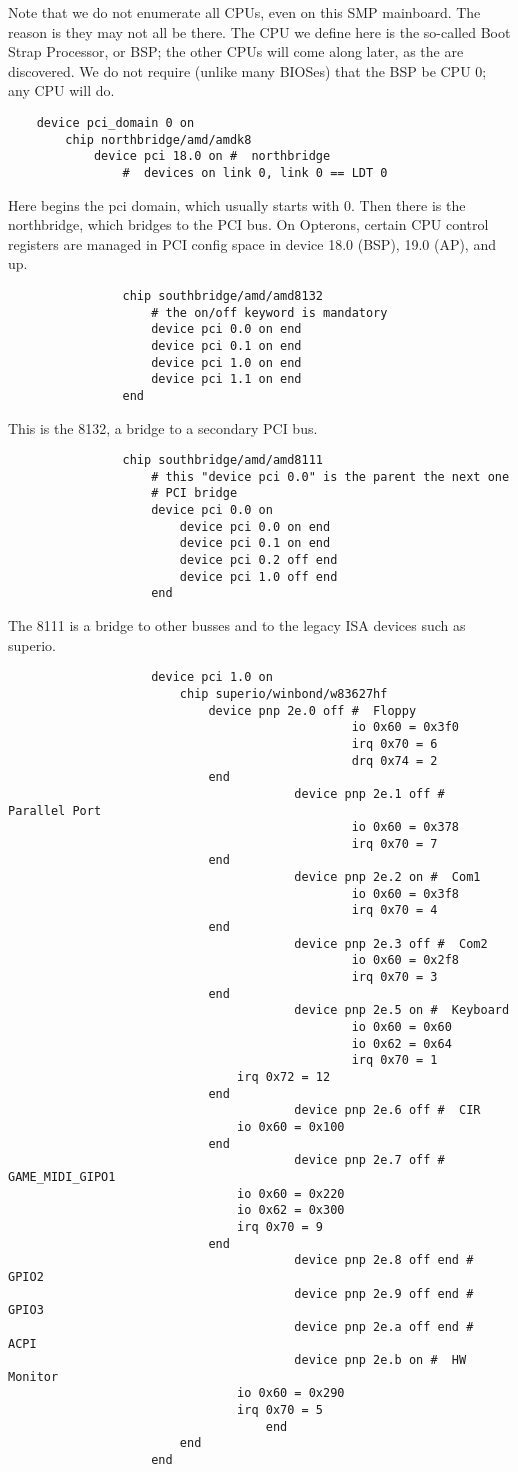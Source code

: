 \documentclass[10pt,letterpaper]{article}
\begin{document}
Note that we do not enumerate all CPUs, even on this SMP mainboard. The reason is they may not all be there. The CPU we define here 
is the so-called Boot Strap Processor, or BSP; the other CPUs will come along later, as the are discovered. We do not require (unlike many 
BIOSes) that the BSP be CPU 0; any CPU will do. 
\begin{verbatim}
	device pci_domain 0 on
		chip northbridge/amd/amdk8
			device pci 18.0 on #  northbridge 
				#  devices on link 0, link 0 == LDT 0
\end{verbatim}
Here begins the pci domain, which usually starts with 0. Then there is the northbridge, which bridges to the PCI bus. On 
Opterons, certain CPU control registers are managed in PCI config space in device 18.0 (BSP), 19.0 (AP), and up. 
\begin{verbatim}
				chip southbridge/amd/amd8132
					# the on/off keyword is mandatory
					device pci 0.0 on end
					device pci 0.1 on end
					device pci 1.0 on end
					device pci 1.1 on end
				end
\end{verbatim}
This is the 8132, a bridge to a secondary PCI bus. 
\begin{verbatim}
				chip southbridge/amd/amd8111
					# this "device pci 0.0" is the parent the next one
					# PCI bridge
					device pci 0.0 on
						device pci 0.0 on end
						device pci 0.1 on end
						device pci 0.2 off end
						device pci 1.0 off end
					end
\end{verbatim}
The 8111 is a bridge to other busses and to the legacy ISA devices such as superio. 
\begin{verbatim}
					device pci 1.0 on
						chip superio/winbond/w83627hf
							device pnp 2e.0 off #  Floppy
                	                 			io 0x60 = 0x3f0
                	                			irq 0x70 = 6
                	                			drq 0x74 = 2
							end
                	        			device pnp 2e.1 off #  Parallel Port
                	                 			io 0x60 = 0x378
                	                			irq 0x70 = 7
							end
                	        			device pnp 2e.2 on #  Com1
                	                 			io 0x60 = 0x3f8
                	                			irq 0x70 = 4
							end
                	        			device pnp 2e.3 off #  Com2
                	                 			io 0x60 = 0x2f8
                	                			irq 0x70 = 3
							end
                	        			device pnp 2e.5 on #  Keyboard
                	                 			io 0x60 = 0x60
                	                 			io 0x62 = 0x64
                	                			irq 0x70 = 1
								irq 0x72 = 12
							end
                	        			device pnp 2e.6 off #  CIR
								io 0x60 = 0x100
							end
                	        			device pnp 2e.7 off #  GAME_MIDI_GIPO1
								io 0x60 = 0x220
								io 0x62 = 0x300
								irq 0x70 = 9
							end						
                	        			device pnp 2e.8 off end #  GPIO2
                	        			device pnp 2e.9 off end #  GPIO3
                	        			device pnp 2e.a off end #  ACPI
                	        			device pnp 2e.b on #  HW Monitor
 					 			io 0x60 = 0x290
								irq 0x70 = 5
                					end
						end
					end
\end{verbatim}
\end{document}

